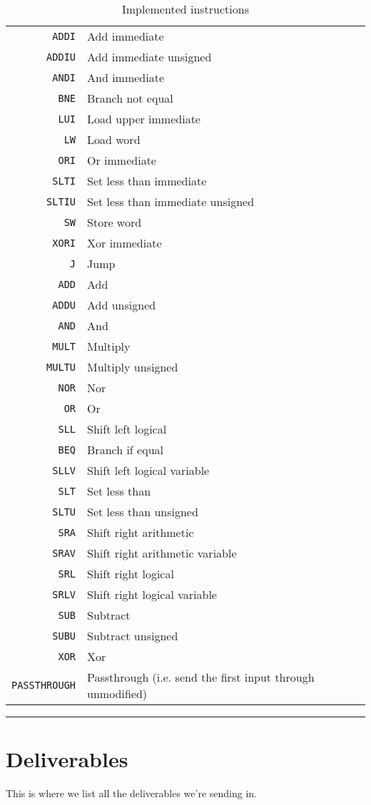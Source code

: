 \begin{table}
    \begin{center}
        \begin{tabular}{r|l}
            \texttt{ADDI} & Add immediate \\
            \texttt{ADDIU} & Add immediate unsigned \\
            \texttt{ANDI} & And immediate \\
            \texttt{BNE} & Branch not equal \\
            \texttt{LUI} & Load upper immediate \\
            \texttt{LW} & Load word \\
            \texttt{ORI} & Or immediate \\
            \texttt{SLTI} & Set less than immediate \\
            \texttt{SLTIU} & Set less than immediate unsigned \\
            \texttt{SW} & Store word \\
            \texttt{XORI} & Xor immediate \\
            \texttt{J} & Jump \\
            \texttt{ADD} & Add \\
            \texttt{ADDU} & Add unsigned \\
            \texttt{AND} & And \\
            \texttt{MULT} & Multiply \\
            \texttt{MULTU} & Multiply unsigned \\
            \texttt{NOR} & Nor \\
            \texttt{OR} & Or \\
            \texttt{SLL} & Shift left logical \\
            \texttt{BEQ} & Branch if equal \\
            \texttt{SLLV} & Shift left logical variable \\
            \texttt{SLT} & Set less than \\
            \texttt{SLTU} & Set less than unsigned \\
            \texttt{SRA} & Shift right arithmetic \\
            \texttt{SRAV} & Shift right arithmetic variable \\
            \texttt{SRL} & Shift right logical \\
            \texttt{SRLV} & Shift right logical variable \\
            \texttt{SUB} & Subtract \\
            \texttt{SUBU} & Subtract unsigned \\
            \texttt{XOR} & Xor \\
            \texttt{PASSTHROUGH} & Passthrough (i.e. send the first input through unmodified) \\
        \end{tabular}
        \smallskip
        \hrule
        \smallskip
        \caption{Implemented instructions}
        \label{table:implemented-instructions}
    \end{center}
\end{table}

\section{Deliverables}

This is where we list all the deliverables we're sending in.
